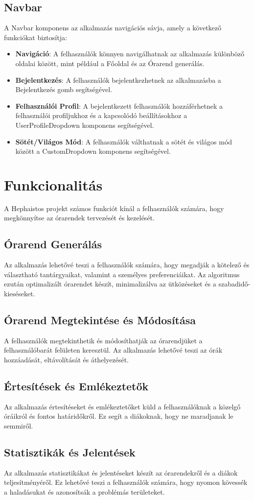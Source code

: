 \documentclass{article}
\begin{document}
\subsection{Navbar}
A Navbar komponens az alkalmazás navigációs sávja, amely a következő funkciókat biztosítja:
\begin{itemize}
    \item \textbf{Navigáció}: A felhasználók könnyen navigálhatnak az alkalmazás különböző oldalai között, mint például a Főoldal és az Órarend generálás.
    \item \textbf{Bejelentkezés}: A felhasználók bejelentkezhetnek az alkalmazásba a Bejelentkezés gomb segítségével.
    \item \textbf{Felhasználói Profil}: A bejelentkezett felhasználók hozzáférhetnek a felhasználói profiljukhoz és a kapcsolódó beállításokhoz a UserProfileDropdown komponens segítségével.
    \item \textbf{Sötét/Világos Mód}: A felhasználók válthatnak a sötét és világos mód között a CustomDropdown komponens segítségével.
\end{itemize}

\section{Funkcionalitás}
A Hephaistos projekt számos funkciót kínál a felhasználók számára, hogy megkönnyítse az órarendek tervezését és kezelését.

\subsection{Órarend Generálás}
Az alkalmazás lehetővé teszi a felhasználók számára, hogy megadják a kötelező és választható tantárgyaikat, valamint a személyes preferenciáikat. Az algoritmus ezután optimalizált órarendet készít, minimalizálva az ütközéseket és a szabadidő-kieséseket.

\subsection{Órarend Megtekintése és Módosítása}
A felhasználók megtekinthetik és módosíthatják az órarendjüket a felhasználóbarát felületen keresztül. Az alkalmazás lehetővé teszi az órák hozzáadását, eltávolítását és áthelyezését.

\subsection{Értesítések és Emlékeztetők}
Az alkalmazás értesítéseket és emlékeztetőket küld a felhasználóknak a közelgő óráikról és fontos határidőkről. Ez segít a diákoknak, hogy ne maradjanak le semmiről.

\subsection{Statisztikák és Jelentések}
Az alkalmazás statisztikákat és jelentéseket készít az órarendekről és a diákok teljesítményéről. Ez lehetővé teszi a felhasználók számára, hogy nyomon kövessék a haladásukat és azonosítsák a problémás területeket.
\end{document}
